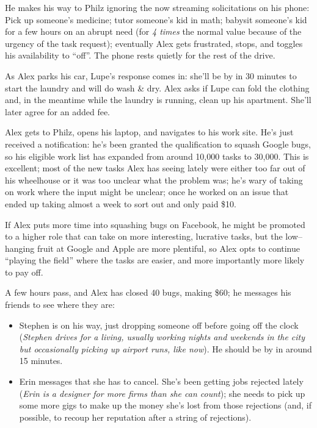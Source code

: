 \documentclass[10pt]{article}
\begin{document}
He makes his way to Philz ignoring the now streaming solicitations on his phone:
Pick up someone's medicine;
tutor someone's kid in math;
babysit someone's kid for a few hours on an abrupt need
(for \textit{4 times} the normal value because of the urgency of the task request);
eventually Alex gets frustrated, stops, and toggles his availability to ``off''.
The phone rests quietly for the rest of the drive.

As Alex parks his car, Lupe's response comes in:
she'll be by in 30 minutes to start the laundry and will do wash \& dry.
Alex asks if Lupe can fold the clothing and, in the meantime while the laundry is running,
clean up his apartment. She'll later agree for an added fee.

Alex gets to Philz, opens his laptop, and navigates to his work site.
He's just received a notification: he's been granted the qualification to squash Google bugs,
so his eligible work list has expanded from around 10,000 tasks to 30,000.
This is excellent; most of the new tasks Alex has seeing lately were either too far out of his wheelhouse
or it was too unclear what the problem was; he's wary of taking on work where the input might be unclear;
once he worked on an issue that ended up taking almost a week to sort out and only paid \$10.

If Alex puts more time into squashing bugs on Facebook,
he might be promoted to a higher role that can take on more interesting,
lucrative tasks,
but the low--hanging fruit at Google and Apple are more plentiful,
so Alex opts to continue ``playing the field'' where the tasks are easier,
and more importantly more likely to pay off.

A few hours pass, and Alex has closed 40 bugs, making \$60;
he messages his friends to see where they are:

\begin{itemize}
\item Stephen is on his way, just dropping someone off before going off the clock
(\textit{Stephen drives for a living,
usually working nights and weekends in the city but occasionally picking up airport runs, like now}).
He should be by in around 15 minutes.
\item Erin messages that she has to cancel.
She's been getting jobs rejected lately
(\textit{Erin is a designer for more firms than she can count});
she needs to pick up some more gigs to make up the money she's lost from those rejections
(and, if possible, to recoup her reputation after a string of rejections).
\end{itemize}
\end{document}
